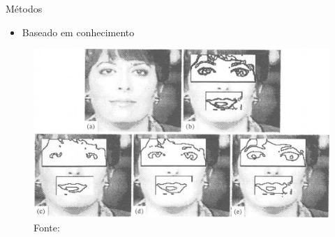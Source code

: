 %    


\begin{frame}{Métodos}
\begin{itemize}
    \item Baseado em conhecimento
\end{itemize}

\begin{figure}[htbp]
    \centering
    \caption{Fonte: }
    \includegraphics[height=0.6\textheight]{imagens/yang_edge_detection.png}
\end{figure}
\end{frame}


